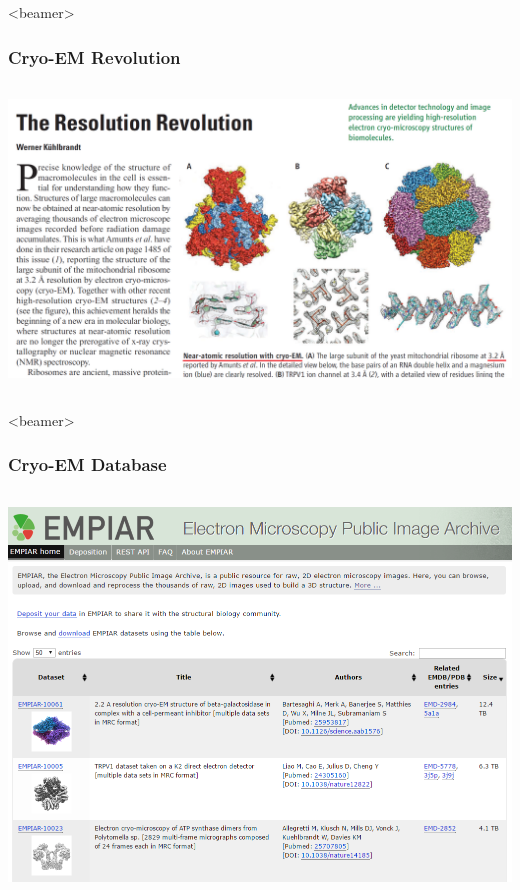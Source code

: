 \documentclass{beamer}
\begin{document}
\begin{frame}<beamer>
\frametitle{Cryo-EM Revolution}
\begin{columns}
\includegraphics[scale=0.23]{figures/news2.png}
\end{columns}
\end{frame}


\begin{frame}<beamer>
\frametitle{Cryo-EM Database}
\begin{columns}
\centering
\includegraphics[scale=0.37]{figures/empiar_snap.png}
\end{columns}
\end{frame}
\end{document}
